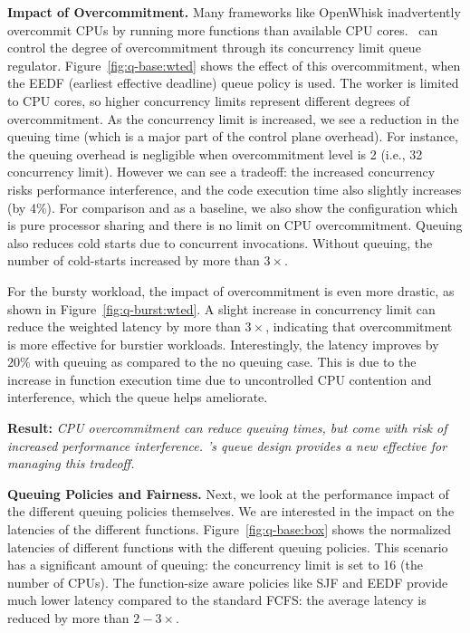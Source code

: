\noindent \textbf{Impact of Overcommitment.}
Many frameworks like OpenWhisk inadvertently overcommit CPUs by running more functions than available CPU cores.
\sysname~can control the degree of overcommitment through its concurrency limit queue regulator.
Figure~\ref{fig:q-base:wted} shows the effect of this overcommitment, when the EEDF (earliest effective deadline) queue policy is used. 
The worker is limited to CPU cores, so higher concurrency limits represent different degrees of overcommitment. 
As the concurrency limit is increased, we see a reduction in the queuing time (which is a major part of the control plane overhead).
For instance, the queuing overhead is negligible when overcommitment level is 2 (i.e., 32 concurrency limit).
However we can see a tradeoff: the increased concurrency risks performance interference, and the code execution time also slightly increases (by 4\%).
For comparison and as a baseline, we also show the  configuration which is pure processor sharing and there is no limit on CPU overcommitment.
%
Queuing also reduces cold starts due to concurrent invocations. 
Without queuing, the number of cold-starts increased by more than $3\times$. 

For the bursty workload, the impact of overcommitment is even more drastic, as shown in Figure~\ref{fig:q-burst:wted}.
A slight increase in concurrency limit can reduce the weighted latency by more than $3\times$, indicating that overcommitment is more effective for burstier workloads.
Interestingly, the latency improves by $20\%$ with queuing as compared to the  no queuing case.
This is due to the increase in function execution time due to uncontrolled CPU contention and interference, which the queue helps ameliorate. 

\noindent \textbf{Result:} \emph{CPU overcommitment can reduce queuing times, but come with risk of increased performance interference. \sysname's queue design provides a new effective  for managing this tradeoff.}


\noindent \textbf{Queuing Policies and Fairness.}
Next, we look at the performance impact of the different queuing policies themselves.
We are interested in the impact on the latencies of the different functions. 
Figure~\ref{fig:q-base:box} shows the normalized latencies of different functions with the different queuing policies.
This scenario has a significant amount of queuing: the concurrency limit is set to 16 (the number of CPUs). 
The function-size aware policies like SJF and EEDF provide much lower latency compared to the standard FCFS: the average latency is reduced by more than $2-3\times$. %

